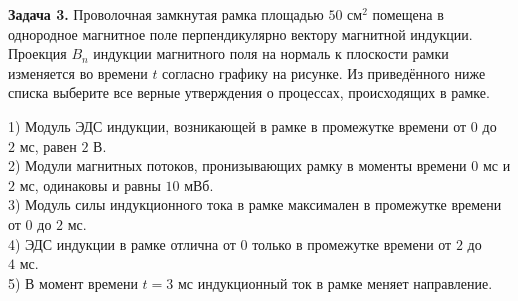 \begin{taskbasic}[code={\label{task:elem_ind_v13_n14}}]
\textbf{Задача 3.} Проволочная замкнутая рамка площадью $50\text{ см}^2$ помещена в однородное магнитное поле перпендикулярно вектору магнитной индукции. Проекция $B_n$ индукции магнитного поля на нормаль к плоскости рамки изменяется во времени $t$ согласно графику на рисунке. Из приведённого ниже списка выберите все верные утверждения о процессах, происходящих в рамке.

\nopagebreak\smallskip
\begin{center}
\end{center}

1) Модуль ЭДС индукции, возникающей в рамке в промежутке времени от $0$ до $2\text{ мс}$, равен $2\text{ В}$.\\
2) Модули магнитных потоков, пронизывающих рамку в моменты времени $0\text{ мс}$ и $2\text{ мс}$, одинаковы и равны $10\text{ мВб}$.\\
3) Модуль силы индукционного тока в рамке максимален в промежутке времени от $0$ до $2\text{ мс}$.\\
4) ЭДС индукции в рамке отлична от $0$ только в промежутке времени от $2$ до $4\text{ мс}$.\\
5) В момент времени $t = 3\text{ мс}$ индукционный ток в рамке меняет направление.

\end{taskbasic}

